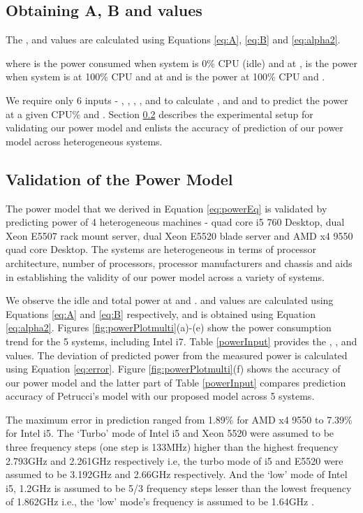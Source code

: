 \documentclass{sig-alternate}
\begin{document}
\subsection{
Obtaining A, B and  values}
The ,  and  values are calculated using Equations \ref{eq:A}, \ref{eq:B} and \ref{eq:alpha2}. 



where  is the power consumed when system is 0\% CPU (idle) and at ,  is the power when system is at 100\% CPU and at  and  is the power at 100\% CPU and .


We require only 6 inputs - , , , ,  and  to calculate ,  and  and to predict the power at a given CPU\% and .
Section \ref{valWM} describes the experimental setup for validating our power model and enlists the accuracy of prediction of our power model across heterogeneous systems.



 \subsection{Validation of the Power Model}
 \label{valWM}

The power model that we derived in Equation \ref{eq:powerEq} is validated by predicting power of 4 heterogeneous machines - quad core i5 760 Desktop, dual Xeon E5507 rack mount server, dual Xeon E5520 blade server and AMD x4 9550 quad core Desktop. The systems are heterogeneous in terms of processor architecture, number of processors, processor manufacturers and chassis and aids in establishing the validity of our power model across a variety of systems. 


We observe the idle and total power at  and .  and  values are calculated using Equations \ref{eq:A} and \ref{eq:B} respectively, and  is obtained using Equation \ref{eq:alpha2}. Figures \ref{fig:powerPlotmulti}(a)-(e) show the power consumption trend for the 5 systems, including Intel i7. Table \ref{powerInput} provides the , , and  values. The deviation of predicted power from the measured power is calculated using Equation \ref{eq:error}. Figure \ref{fig:powerPlotmulti}(f) shows the accuracy of our power model and the latter part of Table \ref{powerInput} compares prediction accuracy of Petrucci's model \cite{Petrucci2011} with our proposed model across 5 systems. 

The maximum error in prediction ranged from 1.89\% for AMD x4 9550 to 7.39\% for Intel i5. The `Turbo' mode of Intel i5 and Xeon 5520 were assumed to be three frequency steps (one step is 133MHz) higher than the highest frequency 2.793GHz and 2.261GHz respectively i.e, the turbo mode of i5 and E5520 were assumed to be 3.192GHz and 2.66GHz respectively. And the `low' mode of Intel i5, 1.2GHz is assumed to be 5/3 frequency steps lesser than the lowest frequency of 1.862GHz i.e., the `low' mode's frequency is assumed to be 1.64GHz \cite{Li2008}. 
\end{document}
